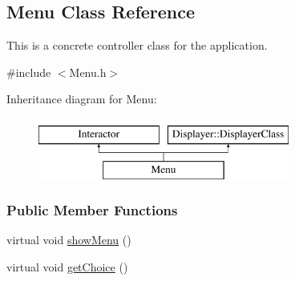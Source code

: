 \hypertarget{class_menu}{\subsection{Menu Class Reference}
\label{class_menu}
}


This is a concrete controller class for the application.  




{\ttfamily \#include $<$Menu.\+h$>$}

Inheritance diagram for Menu\+:\begin{figure}[H]
\begin{center}
\leavevmode
\includegraphics[height=2.000000cm]{class_menu}
\end{center}
\end{figure}
\subsubsection*{Public Member Functions}
\begin{DoxyCompactItemize}
\item 
virtual void \hyperlink{class_menu_ab19f32f8deac0f6c6960f04be8612067}{show\+Menu} ()
\item 
virtual void \hyperlink{class_menu_a2243881fe17494a0f6fc38a9211715d6}{get\+Choice} ()
\end{DoxyCompactItemize}
